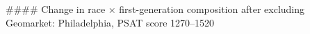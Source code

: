 #### Change in race × first-generation composition after excluding Geomarket: Philadelphia, PSAT score 1270–1520
